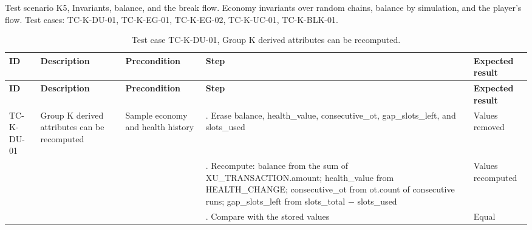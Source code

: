 Test scenario K5, Invariants, balance, and the break flow. Economy invariants over random chains, balance by simulation, and the player's flow. Test cases: TC-K-DU-01, TC-K-EG-01, TC-K-EG-02, TC-K-UC-01, TC-K-BLK-01.

{\small
\begin{longtable}{|>{\raggedright\arraybackslash}p{}|>{\raggedright\arraybackslash}p{}|>{\raggedright\arraybackslash}p{}|>{\raggedright\arraybackslash}p{}|>{\raggedright\arraybackslash}p{}|}
\caption{Test case TC-K-DU-01, Group K derived attributes can be recomputed.} \\
\hline
\textbf{ID} & \textbf{Description} & \textbf{Precondition} & \textbf{Step} & \textbf{Expected result} \\ \hline
\endfirsthead
\hline
\textbf{ID} & \textbf{Description} & \textbf{Precondition} & \textbf{Step} & \textbf{Expected result} \\ \hline
\endhead
TC-K-DU-01 & Group K derived attributes can be recomputed & Sample economy and health history & 1. Erase balance, health\_value, consecutive\_ot, gap\_slots\_left, and slots\_used & Values removed \\ \hline
 &  &  & 2. Recompute: balance from the sum of XU\_TRANSACTION.amount; health\_value from HEALTH\_CHANGE; consecutive\_ot from ot.count of consecutive runs; gap\_slots\_left from slots\_total $-$ slots\_used & Values recomputed \\ \hline
 &  &  & 3. Compare with the stored values & Equal \\ \hline
\end{longtable}
}


